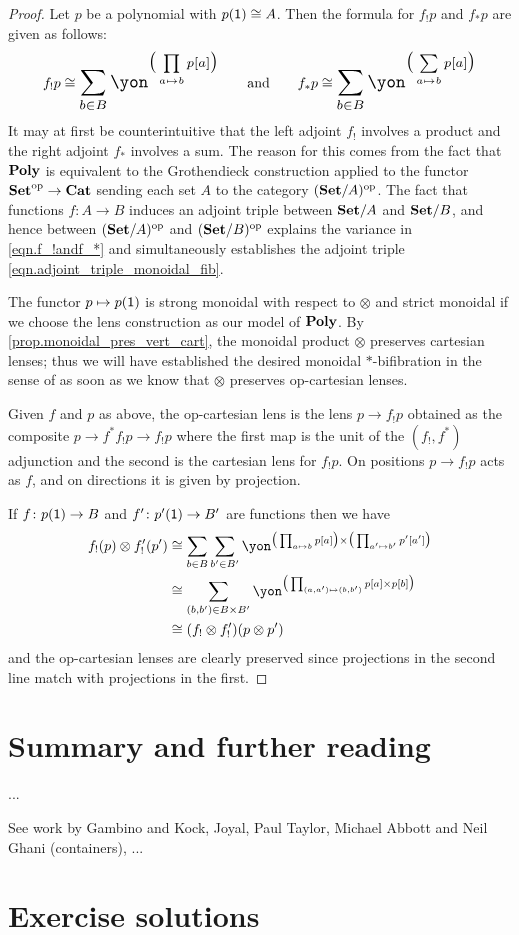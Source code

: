 \documentclass[Book-Poly]{subfiles}
\begin{document}
\begin{proof}
Let $p$ be a polynomial with $p(\textsf{1})\cong A$. Then the formula for $f_!p$ and $f_*p$ are given as follows:
\begin{equation}\label{eqn.f_!andf_*}
f_!p\cong\scalebox{1.3}{$\displaystyle\sum_{b\in B}\yon^{\big(\prod\limits_{a\mapsto b}p[a]\big)}$}
\qqand
f_*p\cong\scalebox{1.3}{$\displaystyle\sum_{b\in B}\yon^{\big(\sum\limits_{a\mapsto b}p[a]\big)}$}
\end{equation}
It may at first be counterintuitive that the left adjoint $f_!$ involves a product and the right adjoint $f_*$ involves a sum. The reason for this comes from the fact that $\mathbf{Poly}$ is equivalent to the Grothendieck construction applied to the functor $\mathbf{Set}^{\textnormal{op}}\to\mathbf{Cat}$ sending each set $A$ to the category $(\mathbf{Set}/A)^{\textnormal{op}}$. The fact that functions $f\colon A\to B$ induces an adjoint triple between $\mathbf{Set}/A$ and $\mathbf{Set}/B$, and hence between $(\mathbf{Set}/A)^{\textnormal{op}}$ and $(\mathbf{Set}/B)^{\textnormal{op}}$ explains the variance in \eqref{eqn.f_!andf_*} and simultaneously establishes the adjoint triple \eqref{eqn.adjoint_triple_monoidal_fib}.

The functor $p\mapsto p(\textsf{1})$ is strong monoidal with respect to $\otimes$ and strict monoidal if we choose the lens construction as our model of $\mathbf{Poly}$. By \cref{prop.monoidal_pres_vert_cart}, the monoidal product $\otimes$ preserves cartesian lenses; thus we will have established the desired monoidal $*$-bifibration in the sense of \cite[Definition 12.1]{shulman2008framed} as soon as we know that $\otimes$ preserves op-cartesian lenses.

Given $f$ and $p$ as above, the op-cartesian lens is the lens $p\to f_!p$ obtained as the composite $p\to f^*f_!p\to f_!p$ where the first map is the unit of the $(f_!,f^*)$ adjunction and the second is the cartesian lens for $f_!p$. On positions $p\to f_!p$ acts as $f$, and on directions it is given by projection. 

If $f\colon p(\textsf{1})\to B$ and $f'\colon p'(\textsf{1})\to B'$ are functions then we have
\begin{align*}
	f_!(p)\otimes f'_!(p')&\cong
	\sum_{b\in B}\sum_{b'\in B'}\yon^{\big(\prod_{a\mapsto b}p[a]\big)\times\big(\prod_{a'\mapsto b'}p'[a']\big)}\\&\cong
	\sum_{(b,b')\in B\times B'}\yon^{\big(\prod_{(a,a')\mapsto(b,b')}p[a]\times p[b]\big)}\\&
	\cong (f_!\otimes f'_!)(p\otimes p')
\end{align*}
and the op-cartesian lenses are clearly preserved since projections in the second line match with projections in the first.
\end{proof}

\section{Summary and further reading}

...

See work by Gambino and Kock, Joyal, Paul Taylor, Michael Abbott and Neil Ghani (containers), ...

\section{Exercise solutions}
{\footnotesize
}
\end{document}
